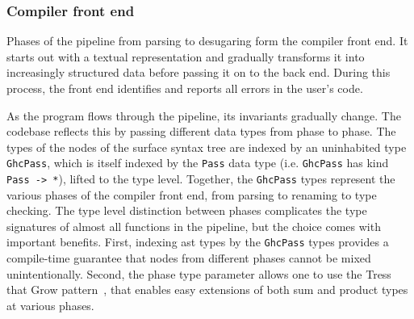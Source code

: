 \documentclass[thesis=B,english]{FITthesis}[2019/12/23]
\newcommand{\hsType}[1]{\texttt{#1}}
\begin{document}
\subsubsection*{Compiler front end}
Phases of the pipeline from parsing to desugaring form the compiler front end.
It starts out with a textual representation and gradually transforms it into
increasingly structured data before passing it on to the back end. During this
process, the front end identifies and reports all errors in the user's code.

As the program flows through the pipeline, its invariants gradually change. The
codebase reflects this by passing different data types from phase to phase. The
types of the nodes of the surface syntax tree are indexed by an uninhabited
type \hsType{GhcPass}, which is itself indexed by the \hsType{Pass} data type
(i.e. \hsType{GhcPass} has kind \hsType{Pass -> *}), lifted to the type level.
Together, the \hsType{GhcPass} types represent the various phases of the
compiler front end, from parsing to renaming to type checking. The type level
distinction between phases complicates the type signatures of almost all
functions in the pipeline, but the choice comes with important benefits.
First, indexing \acrshort{ast} types by the \hsType{GhcPass} types provides a
compile-time guarantee that nodes from different phases cannot be mixed
unintentionally. Second, the phase type parameter allows one to use the Tress
that Grow pattern~\cite{trees-that-grow}, that enables easy extensions of both
sum and product types at various phases.
\end{document}
